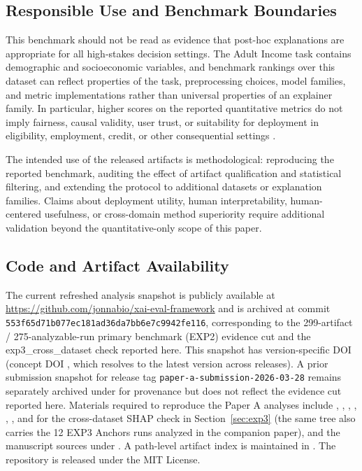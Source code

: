 \documentclass[twoside,11pt]{article}
\begin{document}
\subsection{Responsible Use and Benchmark Boundaries}
This benchmark should not be read as evidence that post-hoc explanations are
appropriate for all high-stakes decision settings. The Adult Income task
contains demographic and socioeconomic variables, and benchmark rankings over
this dataset can reflect properties of the task, preprocessing choices, model
families, and metric implementations rather than universal properties of an
explainer family. In particular, higher scores on the reported quantitative
metrics do not imply fairness, causal validity, user trust, or suitability for
deployment in eligibility, employment, credit, or other consequential settings
\citep{rudin2019stop}.

The intended use of the released artifacts is methodological: reproducing the
reported benchmark, auditing the effect of artifact qualification and
statistical filtering, and extending the protocol to additional datasets or
explanation families. Claims about deployment utility, human interpretability,
human-centered usefulness, or cross-domain method superiority require additional
validation beyond the quantitative-only scope of this paper.

\subsection{Code and Artifact Availability}
\begin{sloppypar}
The current refreshed analysis snapshot is publicly available at
\url{https://github.com/jonnabio/xai-eval-framework} and is archived at
commit \texttt{553f65d71b077ec181ad36da7bb6e7c9942fe116}, corresponding to the
299-artifact / 275-analyzable-run primary benchmark (EXP2) evidence cut and
the exp3\_cross\_dataset check reported here. This snapshot has
version-specific DOI
\href{https://doi.org/10.5281/zenodo.21538180}{}
(concept DOI
\href{https://doi.org/10.5281/zenodo.19297723}{},
which resolves to the latest version across releases). A prior submission
snapshot for release tag \texttt{paper-a-submission-2026-03-28} remains
separately archived under
\href{https://doi.org/10.5281/zenodo.19297724}{}
for provenance but does not reflect the evidence cut reported here. Materials
required to
reproduce the Paper A analyses include
,
,
,
,
,
, and
 for the cross-dataset SHAP
check in Section~\ref{sec:exp3} (the same tree also carries the 12 EXP3 Anchors
runs analyzed in the companion paper), and the manuscript sources under
. A path-level artifact index is maintained in
. The repository is
released under the MIT License.
\end{sloppypar}
\end{document}
